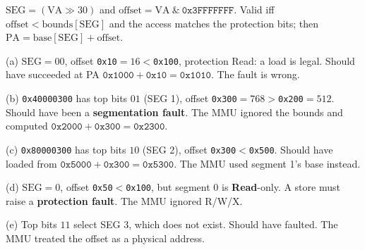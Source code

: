 \documentclass[11pt,a4paper]{article}
\newenvironment{Sol}{%
  \begin{tcolorbox}[sboxstyle, title={Solution}]%
}{%
  \end{tcolorbox}\vspace{0.35em}%
}
\begin{document}
\begin{Sol}
$\mathrm{SEG}=(\mathrm{VA}\gg 30)$ and
$\mathrm{offset}=\mathrm{VA}\ \&\ \texttt{0x3FFFFFFF}$. Valid iff
$\mathrm{offset}<\mathrm{bounds}[\mathrm{SEG}]$ and the access matches
the protection bits; then
$\mathrm{PA}=\mathrm{base}[\mathrm{SEG}]+\mathrm{offset}$.

(a) $\mathrm{SEG}=00$, offset \texttt{0x10}$=16<$\texttt{0x100},
protection Read: a load is legal. Should have succeeded at
PA $\texttt{0x1000}+\texttt{0x10}=\texttt{0x1010}$. The fault is
wrong.

(b) \texttt{0x40000300} has top bits $01$ (SEG 1), offset
\texttt{0x300}$=768>$\texttt{0x200}$=512$. Should have been a
\textbf{segmentation fault}. The MMU ignored the bounds and computed
$\texttt{0x2000}+\texttt{0x300}=\texttt{0x2300}$.

(c) \texttt{0x80000300} has top bits $10$ (SEG 2), offset
\texttt{0x300}$<$\texttt{0x500}. Should have loaded from
$\texttt{0x5000}+\texttt{0x300}=\texttt{0x5300}$. The MMU used
segment 1's base instead.

(d) $\mathrm{SEG}=0$, offset \texttt{0x50}$<$\texttt{0x100}, but
segment 0 is \textbf{Read}-only. A store must raise a
\textbf{protection fault}. The MMU ignored R/W/X.

(e) Top bits $11$ select SEG 3, which does not exist. Should have
faulted. The MMU treated the offset as a physical address.
\end{Sol}
\end{document}
